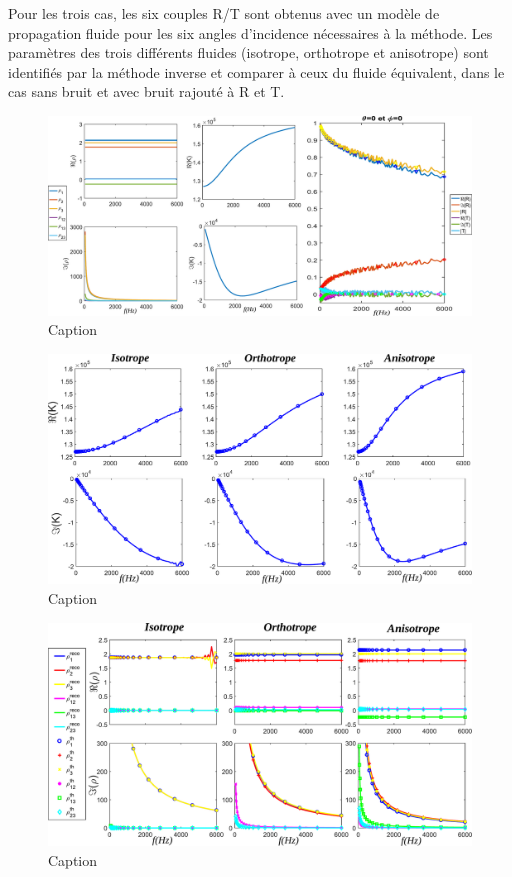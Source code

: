 \documentclass[12pt]{report}
\begin{document}
  
    Pour les trois cas, les six couples R/T sont obtenus avec un modèle de propagation fluide pour les six angles d'incidence nécessaires à la méthode. Les paramètres des trois différents fluides (isotrope, orthotrope et anisotrope) sont identifiés par la méthode inverse et comparer à ceux du fluide équivalent, dans le cas sans bruit et avec bruit rajouté à R et T. 

    \begin{figure}[ht!]
        \centering
        \includegraphics[scale=0.45]{RT_noise.pdf}
        \caption{Caption}
        \label{RT_noise}
    \end{figure}

    \begin{figure}[ht!]
        \centering
        \includegraphics[scale=0.45]{Bulk.pdf}
        \caption{Caption}
        \label{bulk}
    \end{figure}

    \begin{figure}[ht!]
        \centering
        \includegraphics[scale=0.45]{Density_rot.pdf}
        \caption{Caption}
        \label{rho_rot}
    \end{figure}
    
\end{document}
